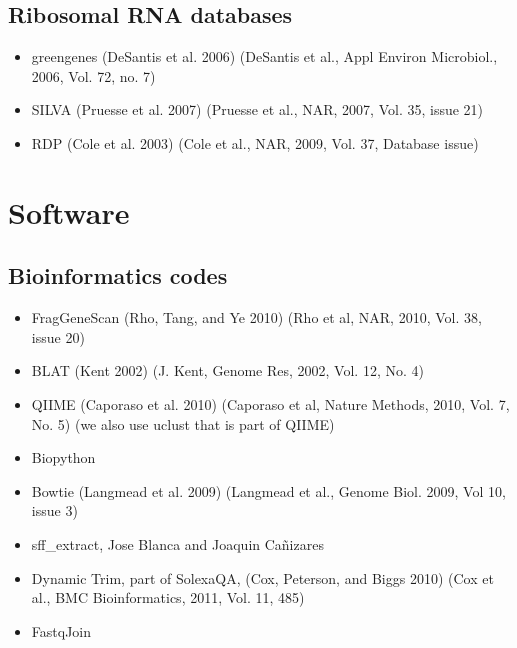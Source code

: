 \documentclass[letterpaper,10pt,english]{sphinxmanual}
\begin{document}
\subsection{Ribosomal RNA databases}
\label{\detokenize{user_manual:ribosomal-rna-databases}}\begin{itemize}
\item {} 
greengenes (DeSantis et al. 2006) (DeSantis et al., Appl Environ
Microbiol., 2006, Vol. 72, no. 7)

\item {} 
SILVA (Pruesse et al. 2007) (Pruesse et al., NAR, 2007, Vol. 35,
issue 21)

\item {} 
RDP (Cole et al. 2003) (Cole et al., NAR, 2009, Vol. 37, Database
issue)

\end{itemize}


\section{Software}
\label{\detokenize{user_manual:software}}

\subsection{Bioinformatics codes}
\label{\detokenize{user_manual:bioinformatics-codes}}\label{\detokenize{user_manual:section-bioinformatics-codes}}\begin{itemize}
\item {} 
FragGeneScan (Rho, Tang, and Ye 2010) (Rho et al, NAR, 2010, Vol. 38,
issue 20)

\item {} 
BLAT (Kent 2002) (J. Kent, Genome Res, 2002, Vol. 12, No. 4)

\item {} 
QIIME (Caporaso et al. 2010) (Caporaso et al, Nature Methods, 2010,
Vol. 7, No. 5) (we also use uclust that is part of QIIME)

\item {} 
Biopython

\item {} 
Bowtie (Langmead et al. 2009) (Langmead et al., Genome Biol. 2009,
Vol 10, issue 3)

\item {} 
sff\_extract, Jose Blanca and Joaquin Cañizares

\item {} 
Dynamic Trim, part of SolexaQA, (Cox, Peterson, and Biggs 2010) (Cox
et al., BMC Bioinformatics, 2011, Vol. 11, 485)

\item {} 
FastqJoin

\end{itemize}
\end{document}
